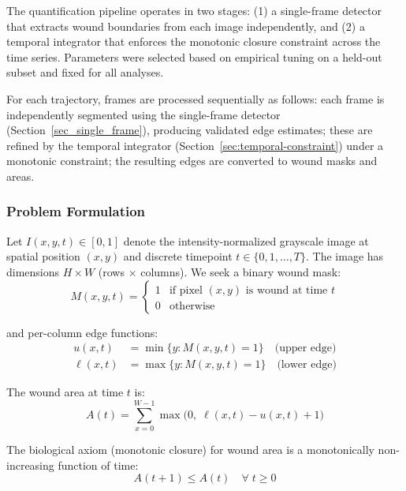 The quantification pipeline operates in two stages: (1) a single-frame detector that extracts wound boundaries from each image independently, and (2) a temporal integrator that enforces the monotonic closure constraint across the time series. Parameters were selected based on empirical tuning on a held-out subset and fixed for all analyses.

For each trajectory, frames are processed sequentially as follows: each frame is independently segmented using the single-frame detector (Section~\ref{sec_single_frame}), producing validated edge estimates; these are refined by the temporal integrator (Section~\ref{sec:temporal-constraint}) under a monotonic constraint; the resulting edges are converted to wound masks and areas.

\subsubsection{Problem Formulation}

Let $I(x, y, t) \in [0, 1]$ denote the intensity-normalized grayscale image at spatial
position $(x, y)$ and discrete timepoint $t \in \{0, 1, \ldots, T\}$. The image has dimensions $H \times W$ (rows $\times$ columns).
We seek a binary wound mask:
\begin{equation}
	M(x, y, t) = \begin{cases}
		1 & \text{if pixel $(x, y)$ is wound at time $t$} \\
		0 & \text{otherwise}
	\end{cases}
	\label{eq:mask}
\end{equation}

and per-column edge functions:
\begin{align}
	u(x, t) &= \min\{y : M(x, y, t) = 1\} \quad \text{(upper edge)} \label{eq:upper-edge} \\
	\ell(x, t) &= \max\{y : M(x, y, t) = 1\} \quad \text{(lower edge)} \label{eq:lower-edge}
\end{align}

The wound area at time $t$ is:
\begin{equation}
	A(t) = \sum_{x=0}^{W-1} \max\!\bigl(0,\; \ell(x,t) - u(x,t) + 1\bigr)
	\label{eq:area}
\end{equation}

The biological axiom (monotonic closure) for wound area is a monotonically non-increasing
function of time:
\begin{equation}
	\boxed{A(t+1) \leq A(t) \quad \forall\; t \geq 0}
	\label{eq:monotonic}
\end{equation}

